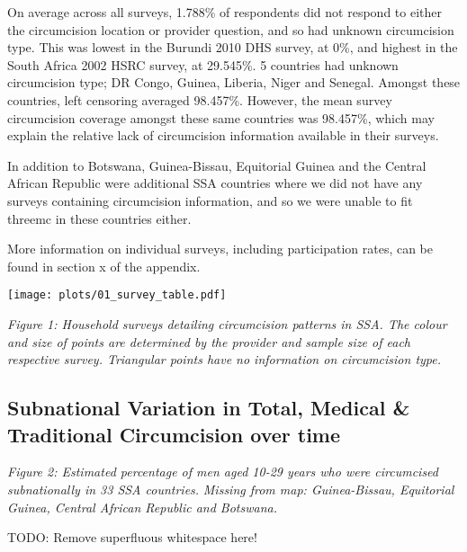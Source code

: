 \documentclass[a4paper, 12pt]{article}
\begin{document}
On average across all surveys, 1.788\% of respondents did not respond to either the circumcision location or provider question, and so had unknown circumcision type. 
This was lowest in the Burundi 2010 DHS survey, at 0\%, and highest in the South Africa 2002 HSRC survey, at 29.545\%.
5 countries had unknown circumcision type; DR Congo, Guinea, Liberia, Niger and Senegal. 
Amongst these countries, left censoring averaged 98.457\%. 
However, the mean survey circumcision coverage amongst these same countries was 98.457\%, which may explain the relative lack of circumcision information available in their surveys.

In addition to Botswana, Guinea-Bissau, Equitorial Guinea and the Central African Republic were additional SSA countries where we did not have any surveys containing circumcision information, and so we were unable to fit threemc in these countries either. 

More information on individual surveys, including participation rates, can be found in section x of the appendix. 

\begin{center}
\texttt{[image: plots/01\_survey\_table.pdf]}
\end{center}

\emph{Figure 1: Household surveys detailing circumcision patterns in SSA. The colour and size of points are determined by the provider and sample size of each respective survey. Triangular points have no information on circumcision type.}

\subsection{Subnational Variation in Total, Medical \& Traditional Circumcision over time}
\label{sec:org0d1ffe6}

\emph{Figure 2: Estimated percentage of men aged 10-29 years who were circumcised subnationally in 33 SSA countries.} 
\emph{Missing from map: Guinea-Bissau, Equitorial Guinea, Central African Republic and Botswana.}

TODO: Remove superfluous whitespace here!
\end{document}
